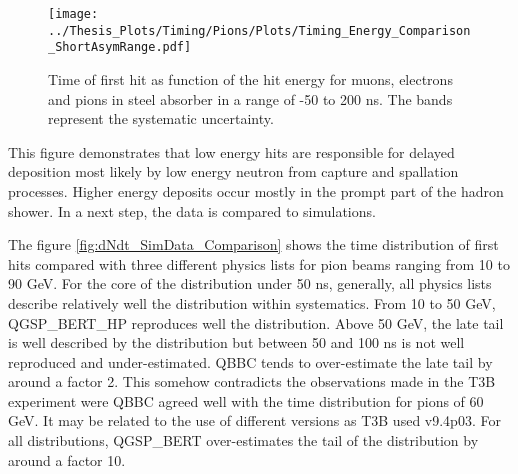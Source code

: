 \begin{figure}[htbp!]
	\centering
	\texttt{[image: ../Thesis\_Plots/Timing/Pions/Plots/Timing\_Energy\_Comparison\_ShortAsymRange.pdf]}
	\caption{Time of first hit as function of the hit energy for muons, electrons and pions in steel absorber in a range of -50 to 200 ns. The bands represent the systematic uncertainty.}
	\label{fig:Energy_Comparison}
\end{figure}

This figure demonstrates that low energy hits are responsible for delayed deposition most likely by low energy neutron from capture and spallation processes. Higher energy deposits occur mostly in the prompt part of the hadron shower. In a next step, the data is compared to simulations.

The figure \ref{fig:dNdt_SimData_Comparison} shows the time distribution of first hits compared with three different physics lists for pion beams ranging from 10 to 90 GeV. For the core of the distribution under 50 ns, generally, all physics lists describe relatively well the distribution within systematics. From 10 to 50 GeV, QGSP\_BERT\_HP reproduces well the distribution. Above 50 GeV, the late tail is well described by the distribution but between 50 and 100 ns is not well reproduced and under-estimated. QBBC tends to over-estimate the late tail by around a factor 2. This somehow contradicts the observations made in the T3B experiment were QBBC agreed well with the time distribution for pions of 60 GeV. It may be related to the use of different \geant versions as T3B used \geant v9.4p03. For all distributions, QGSP\_BERT over-estimates the tail of the distribution by around a factor 10.


